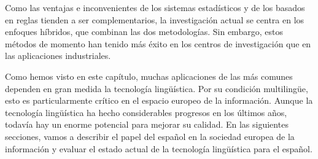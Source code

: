 \begin{multicols}{2}
Como las ventajas e inconvenientes de los sistemas estadísticos y de los basados en reglas tienden a ser complementarios, la investigación actual se centra en los enfoques híbridos, que combinan las dos metodologías. Sin embargo, estos métodos de momento han tenido más éxito en los centros de investigación que en las aplicaciones industriales.

Como hemos visto en este capítulo, muchas aplicaciones de las más comunes dependen en gran medida la tecnología lingüística. Por su condición multilingüe, esto es particularmente crítico en el espacio europeo de la información. Aunque la tecnología lingüística ha hecho considerables progresos en los últimos años, todavía hay un enorme potencial para mejorar su calidad. En las siguientes secciones, vamos a describir el papel del español en la sociedad europea de la información y evaluar el estado actual de la tecnología lingüística para el español.
\end{multicols}

\clearpage



